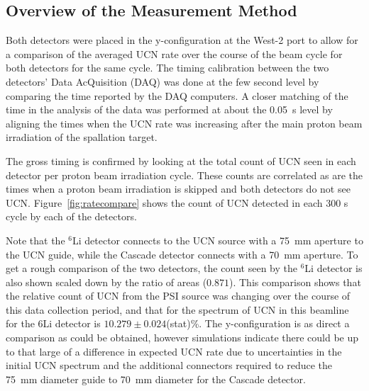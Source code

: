 \documentclass[twocolumn]{bmcart}
\begin{document}


\subsection{Overview of the Measurement Method}

Both detectors were placed in the y-configuration at the West-2 port
to allow for a comparison of the averaged UCN rate over the course of
the beam cycle for both detectors for the same cycle.  The timing
calibration between the two detectors' Data AcQuisition (DAQ) was done
at the few second level by comparing the time reported by the DAQ
computers.  A closer matching of the time in the analysis of the data
was performed at about the 0.05~s level by aligning the times when the
UCN rate was increasing after the main proton beam irradiation of the
spallation target.

The gross timing is confirmed by looking at the total count of UCN
seen in each detector per proton beam irradiation cycle.  These counts
are correlated as are the times when a proton beam irradiation is
skipped and both detectors do not see UCN.
Figure~\ref{fig:ratecompare} shows the count of UCN detected in each
300 s cycle by each of the detectors.

Note that the $^{6}$Li detector connects to the UCN source with a
75~mm aperture to the UCN guide, while the Cascade detector connects
with a 70~mm aperture.  To get a rough comparison of the two
detectors, the count seen by the $^{6}$Li detector is also shown
scaled down by the ratio of areas ($0.871$).  This comparison shows
that the relative count of UCN from the PSI source was changing over
the course of this data collection period, and that for the spectrum
of UCN in this beamline for the ${6}$Li detector is $10.279 \pm
0.024$(stat)\%.  The y-configuration is as direct a comparison as
could be obtained, however simulations indicate there could be up to
that large of a difference in expected UCN rate due to uncertainties
in the initial UCN spectrum and the additional connectors required to
reduce the 75~mm diameter guide to 70~mm diameter for the Cascade
detector.
\end{document}
